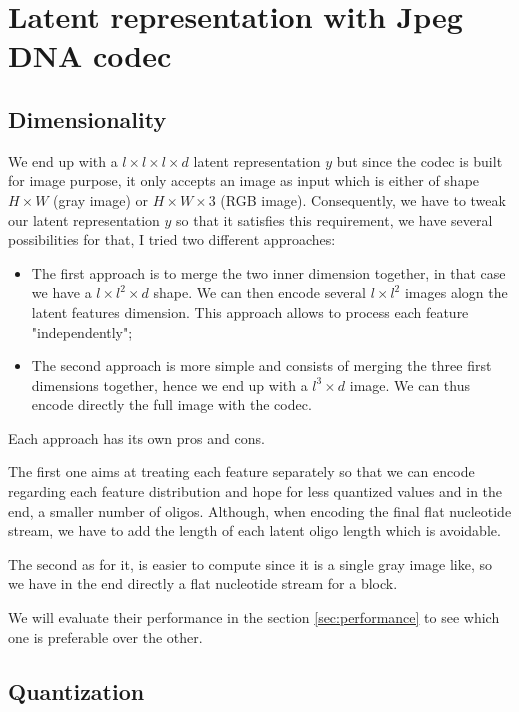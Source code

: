 \section{Latent representation with Jpeg DNA codec}

\subsection{Dimensionality}

We end up with a $l \times l \times l \times d$ latent representation $y$ but since the codec is built for image purpose, it only accepts an image as input which is either of shape $H \times W$ (gray image) or $H \times W \times 3$ (RGB image). 
Consequently, we have to tweak our latent representation $y$ so that it satisfies this requirement, we have several possibilities for that, I tried two different approaches:

\begin{itemize}
    \item The first approach is to merge the two inner dimension together, in that case we have a $l \times l^2 \times d$ shape. We can then encode several $l \times l^2$ images alogn the latent features dimension. This approach allows to process each feature "independently";
    \item The second approach is more simple and consists of merging the three first dimensions together, hence we end up with a $l^3 \times d$ image. We can thus encode directly the full image with the codec.
\end{itemize}

Each approach has its own pros and cons. 

The first one aims at treating each feature separately so that we can encode regarding each feature distribution and hope for less quantized values and in the end, a smaller number of oligos. Although, when encoding the final flat nucleotide stream, we have to add the length of each latent oligo length which is avoidable.

The second as for it, is easier to compute since it is a single gray image like, so we have in the end directly a flat nucleotide stream for a block. 

We will evaluate their performance in the section \ref{sec:performance} to see which one is preferable over the other.

\subsection{Quantization}
\label{subsec:quantization}

